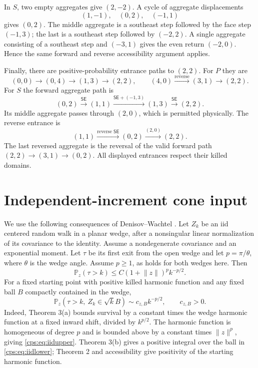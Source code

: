 \documentclass[11pt,letterpaper]{article}
\numberwithin{equation}{section}
\theoremstyle{remark}\newtheorem{remark}[theorem]{Remark}
\newcommand{\PP}{\mathbb P}
\newcommand{\SE}{\mathsf{SE}}
\newcommand{\norm}[1]{\lVert#1\rVert}
\begin{document}
In $S$, two empty aggregates give $(2,-2)$. A cycle of aggregate displacements
\begin{equation}\label{cps:eq:Saccess}
 (1,-1),\quad(0,2),\quad(-1,1)
\end{equation}
gives $(0,2)$. The middle aggregate is a southeast step followed by the face step $(-1,3)$; the last is a southeast step followed by $(-2,2)$. A single aggregate consisting of a southeast step and $(-3,1)$ gives the even return $(-2,0)$. Hence the same forward and reverse accessibility argument applies.

Finally, there are positive-probability entrance paths to $(2,2)$. For $P$ they are
\begin{equation}\label{cps:eq:Pentrances}
 (0,0)\longrightarrow(0,4)\longrightarrow(1,3)\longrightarrow(2,2),
 \qquad
 (4,0)\xrightarrow{\text{reverse}}(3,1)\longrightarrow(2,2).
\end{equation}
For $S$ the forward aggregate path is
\begin{equation}\label{cps:eq:Sentrances}
 (0,2)\xrightarrow{\SE}(1,1)
 \xrightarrow{\SE+(-1,3)}(1,3)
 \xrightarrow{\SE}(2,2).
\end{equation}
Its middle aggregate passes through $(2,0)$, which is permitted physically. The reverse entrance is
\begin{equation}
 (1,1)\xrightarrow{\text{reverse }\SE}(0,2)
 \xrightarrow{(2,0)}(2,2).
\end{equation}
The last reversed aggregate is the reversal of the valid forward path
$(2,2)\to(3,1)\to(0,2)$. All displayed entrances respect their killed domains.

\section{Independent-increment cone input}\label{cps:sec:iid}
We use the following consequences of Denisov--Wachtel \cite[Theorems 2 and 3]{DWrevisited}. Let $Z_k$ be an iid centered random walk in a planar wedge, after a nonsingular linear normalization of its covariance to the identity. Assume a nondegenerate covariance and an exponential moment. Let $\tau$ be its first exit from the open wedge and let $p=\pi/\theta$, where $\theta$ is the wedge angle. Assume $p\ge1$, as holds for both wedges here. Then
\begin{equation}\label{cps:eq:iidupper}
 \PP_z(\tau>k)\le C(1+\norm z)^p k^{-p/2}.
\end{equation}
For a fixed starting point with positive killed harmonic function and any fixed ball $B$ compactly contained in the wedge,
\begin{equation}\label{cps:eq:iidlower}
 \PP_z(\tau>k,\ Z_k\in\sqrt{k}B)\sim c_{z,B}k^{-p/2},
 \qquad c_{z,B}>0.
\end{equation}
Indeed, Theorem 3(a) bounds survival by a constant times the wedge harmonic function at a fixed inward shift, divided by $k^{p/2}$. The harmonic function is homogeneous of degree $p$ and is bounded above by a constant times $\norm z^p$, giving \eqref{cps:eq:iidupper}. Theorem 3(b) gives a positive integral over the ball in \eqref{cps:eq:iidlower}; Theorem 2 and accessibility give positivity of the starting harmonic function.
\end{document}
